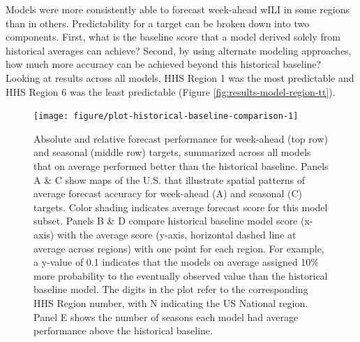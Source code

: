 \documentclass{article}\usepackage[]{graphicx}\usepackage[]{color}
\newenvironment{knitrout}{}{} %
\begin{document}
Models were more consistently able to forecast week-ahead wILI in some regions than in others.
Predictability for a target can be broken down into two components. 
First, what is the baseline score that a model derived solely from historical averages can achieve? 
Second, by using alternate modeling approaches, how much more accuracy can be achieved beyond this historical baseline? 
Looking at results across all models,
HHS Region 1 was the most predictable and HHS Region 6 was the least predictable (Figure \ref{fig:results-model-region-tt}).








\begin{knitrout}
\color{fgcolor}\begin{figure}
\texttt{[image: figure/plot-historical-baseline-comparison-1]} \caption[Absolute and relative forecast performance for week-ahead (top row) and seasonal (middle row) targets, summarized across all models that on average performed better than the historical baseline]{Absolute and relative forecast performance for week-ahead (top row) and seasonal (middle row) targets, summarized across all models that on average performed better than the historical baseline. Panels A \& C show maps of the U.S. that illustrate spatial patterns of average forecast accuracy for week-ahead (A) and seasonal (C) targets. Color shading indicates average forecast score for this model subset. Panels B \& D compare historical baseline model score (x-axis) with the average score (y-axis, horizontal dashed line at average across regions) with one point for each region. For example, a y-value of 0.1 indicates that the models on average assigned 10\% more probability to the eventually observed value than the historical baseline model. The digits in the plot refer to the corresponding HHS Region number, with N indicating the US National region. Panel E shows the number of seasons each model had average performance above the historical baseline.}\label{fig:plot-historical-baseline-comparison}
\end{figure}


\end{knitrout}
\end{document}
